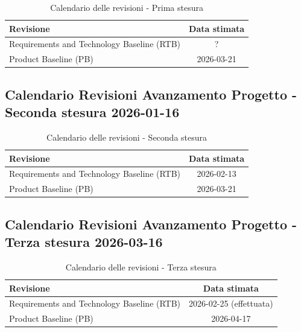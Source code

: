 \documentclass[a4paper, 11pt, oneside]{scrartcl} %
\begin{document}
\begin{table}[!ht]
\centering
\renewcommand{\arraystretch}{1.5}
\begin{tabularx}{0.8\textwidth}{L c}
\toprule
\textbf{Revisione} & \textbf{Data stimata} \\
\midrule
Requirements and Technology Baseline{\scriptsize{}} (RTB) & ? \\
\midrule
Product Baseline (PB) & 2026-03-21 \\
\bottomrule
\end{tabularx}
\caption{Calendario delle revisioni - Prima stesura}
\label{tab_fig_calendario_delle_revisioni_pri}
\end{table}

\subsection{Calendario Revisioni Avanzamento Progetto - Seconda stesura 2026-01-16}

\begin{table}[!ht]
\centering
\renewcommand{\arraystretch}{1.5}
\begin{tabularx}{0.8\textwidth}{L c}
\toprule
\textbf{Revisione} & \textbf{Data stimata} \\
\midrule
Requirements and Technology Baseline{\scriptsize{}} (RTB) & 2026-02-13 \\
\midrule
Product Baseline (PB) & 2026-03-21 \\
\bottomrule
\end{tabularx}
\caption{Calendario delle revisioni - Seconda stesura}
\label{tab_fig_calendario_delle_revisioni_sec}
\end{table}

\subsection{Calendario Revisioni Avanzamento Progetto - Terza stesura 2026-03-16}

\begin{table}[!ht]
\centering
\renewcommand{\arraystretch}{1.5}
\begin{tabularx}{0.8\textwidth}{L c}
\toprule
\textbf{Revisione} & \textbf{Data stimata} \\
\midrule
Requirements and Technology Baseline{\scriptsize{}} (RTB) & 2026-02-25 (effettuata) \\
\midrule
Product Baseline (PB) & 2026-04-17 \\
\bottomrule
\end{tabularx}
\caption{Calendario delle revisioni - Terza stesura}
\label{tab_fig_calendario_delle_revisioni_ter}
\end{table}
\end{document}
